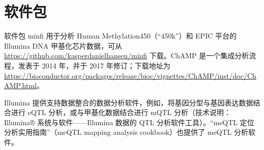 \section*{软件包}

软件包 minfi 用于分析 Human Methylation450（“450k”）和 EPIC 平台的 Illumina DNA 甲基化芯片数据，可从 \url{https://github.com/kasperdanielhansen/minfi} 下载。ChAMP 是一个集成分析流程，发表于 2014 年，并于 2017 年修订；下载地址为 \url{https://bioconductor.org/packages/release/bioc/vignettes/ChAMP/inst/doc/ChAMP.html}。

Illumina 提供支持数据整合的数据分析软件，例如，将基因分型与基因表达数据结合进行 eQTL 分析，或与甲基化数据结合进行 mQTL 分析（技术说明：Illumina® 系统与软件——Illumina 数据的 QTL 分析软件工具）。“meQTL 定位分析实用指南”（meQTL mapping analysis cookbook）也提供了 meQTL 分析软件。
